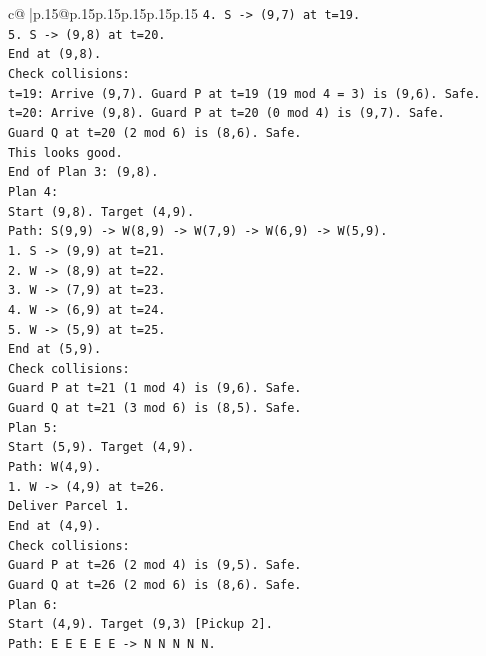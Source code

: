 \documentclass{article}
\begin{document}
{\begin{supertabular}{c@{$\;$}|p{.15\linewidth}@{}p{.15\linewidth}p{.15\linewidth}p{.15\linewidth}p{.15\linewidth}p{.15\linewidth}}
{{{\texttt{4. S {-}> (9,7) at t=19.} \\
\texttt{5. S {-}> (9,8) at t=20.} \\
\texttt{End at (9,8).} \\
\texttt{Check collisions:} \\
\texttt{t=19: Arrive (9,7). Guard P at t=19 (19 mod 4 = 3) is (9,6). Safe.} \\
\texttt{t=20: Arrive (9,8). Guard P at t=20 (0 mod 4) is (9,7). Safe.} \\
\texttt{Guard Q at t=20 (2 mod 6) is (8,6). Safe.} \\
\texttt{This looks good.} \\
\texttt{End of Plan 3: (9,8).} \\
\texttt{Plan 4:} \\
\texttt{Start (9,8). Target (4,9).} \\
\texttt{Path: S(9,9) {-}> W(8,9) {-}> W(7,9) {-}> W(6,9) {-}> W(5,9).} \\
\texttt{1. S {-}> (9,9) at t=21.} \\
\texttt{2. W {-}> (8,9) at t=22.} \\
\texttt{3. W {-}> (7,9) at t=23.} \\
\texttt{4. W {-}> (6,9) at t=24.} \\
\texttt{5. W {-}> (5,9) at t=25.} \\
\texttt{End at (5,9).} \\
\texttt{Check collisions:} \\
\texttt{Guard P at t=21 (1 mod 4) is (9,6). Safe.} \\
\texttt{Guard Q at t=21 (3 mod 6) is (8,5). Safe.} \\
\texttt{Plan 5:} \\
\texttt{Start (5,9). Target (4,9).} \\
\texttt{Path: W(4,9).} \\
\texttt{1. W {-}> (4,9) at t=26.} \\
\texttt{Deliver Parcel 1.} \\
\texttt{End at (4,9).} \\
\texttt{Check collisions:} \\
\texttt{Guard P at t=26 (2 mod 4) is (9,5). Safe.} \\
\texttt{Guard Q at t=26 (2 mod 6) is (8,6). Safe.} \\
\texttt{Plan 6:} \\
\texttt{Start (4,9). Target (9,3) {[}Pickup 2{]}.} \\
\texttt{Path: E E E E E {-}> N N N N N.} \\
}}}
\end{supertabular}}
\end{document}
